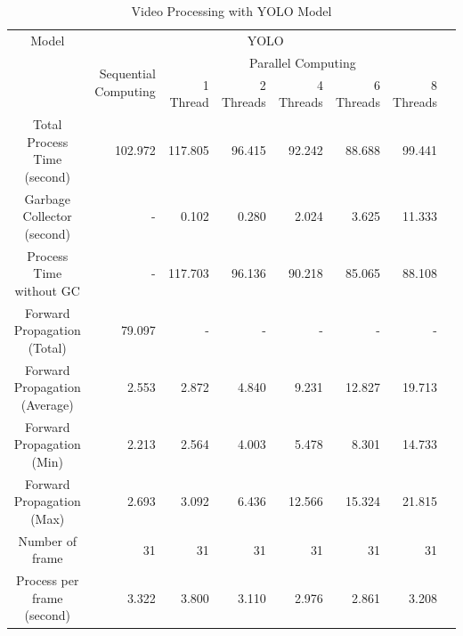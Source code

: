         \begin{table}[!htp]\centering
            \scriptsize
            \begin{tabular}{lrrrrrrrr}\toprule
                \multicolumn{2}{c}{Model} &\multicolumn{6}{c}{YOLO} \\\cmidrule{1-8}
                \multicolumn{2}{c}{\multirow{2}{*}{}} &\multirow{2}{*}{Sequential Computing} &\multicolumn{5}{c}{Parallel Computing} \\\cmidrule{4-8}
                & & &1 Thread &2 Threads &4 Threads &6 Threads &8 Threads \\\midrule
                \multicolumn{2}{c}{Total Process Time (second)} &102.972 &117.805 &96.415 &92.242 &88.688 &99.441 \\
                \multicolumn{2}{c}{Garbage Collector (second)} &- &0.102 &0.280 &2.024 &3.625 &11.333 \\
                \multicolumn{2}{c}{Process Time without GC} &- &117.703 &96.136 &90.218 &85.065 &88.108 \\
                \multicolumn{2}{c}{Forward Propagation (Total)} &79.097 &- &- &- &- &- \\
                \multicolumn{2}{c}{Forward Propagation (Average)} &2.553 &2.872 &4.840 &9.231 &12.827 &19.713 \\
                \multicolumn{2}{c}{Forward Propagation (Min)} &2.213 &2.564 &4.003 &5.478 &8.301 &14.733 \\
                \multicolumn{2}{c}{Forward Propagation (Max)} &2.693 &3.092 &6.436 &12.566 &15.324 &21.815 \\
                \multicolumn{2}{c}{Number of frame} &31 &31 &31 &31 &31 &31 \\
                \multicolumn{2}{c}{Process per frame (second)} &3.322 &3.800 &3.110 &2.976 &2.861 &3.208 \\
                \bottomrule
            \end{tabular}

            \caption{Video Processing with YOLO Model}\label{yolo:performance}
        \end{table}

